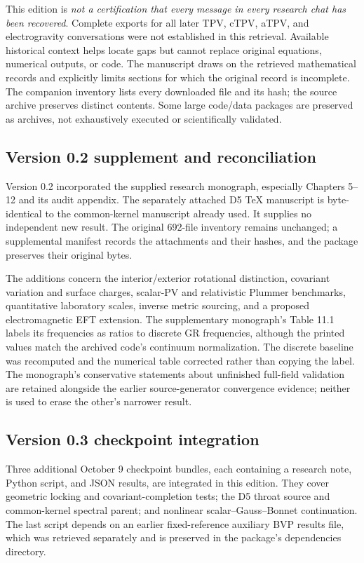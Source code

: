 \documentclass[11pt,oneside]{report}
\begin{document}
This edition is \emph{not a certification that every message in every research chat has been recovered}. Complete exports for all later TPV, cTPV, aTPV, and electrogravity conversations were not established in this retrieval. Available historical context helps locate gaps but cannot replace original equations, numerical outputs, or code. The manuscript draws on the retrieved mathematical records and explicitly limits sections for which the original record is incomplete. The companion inventory lists every downloaded file and its hash; the source archive preserves distinct contents. Some large code/data packages are preserved as archives, not exhaustively executed or scientifically validated.

\subsection{Version 0.2 supplement and reconciliation}
Version 0.2 incorporated the supplied research monograph, especially Chapters 5--12 and its audit appendix. The separately attached D5 TeX manuscript is byte-identical to the common-kernel manuscript already used. It supplies no independent new result. The original 692-file inventory remains unchanged; a supplemental manifest records the attachments and their hashes, and the package preserves their original bytes.

The additions concern the interior/exterior rotational distinction, covariant variation and surface charges, scalar-PV and relativistic Plummer benchmarks, quantitative laboratory scales, inverse metric sourcing, and a proposed electromagnetic EFT extension. The supplementary monograph's Table 11.1 labels its frequencies as ratios to discrete GR frequencies, although the printed values match the archived code's continuum normalization. The discrete baseline was recomputed and the numerical table corrected rather than copying the label. The monograph's conservative statements about unfinished full-field validation are retained alongside the earlier source-generator convergence evidence; neither is used to erase the other's narrower result.

\subsection{Version 0.3 checkpoint integration}
Three additional October 9 checkpoint bundles, each containing a research note, Python script, and JSON results, are integrated in this edition. They cover geometric locking and covariant-completion tests; the D5 throat source and common-kernel spectral parent; and nonlinear scalar--Gauss--Bonnet continuation. The last script depends on an earlier fixed-reference auxiliary BVP results file, which was retrieved separately and is preserved in the package's dependencies directory.
\end{document}
